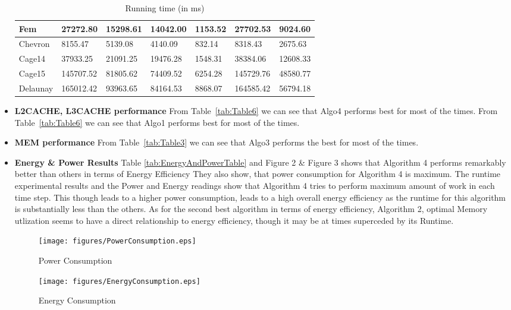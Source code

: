 \begin{itemize}
\begin{table}[th]
\begin{center}
\begin{tabular}{| l | l | l | l | l | l | l |}
	Fem & 27272.80 & 15298.61 & 14042.00 & \cellcolor{blue!25} 1153.52 & 27702.53 & 9024.60\\ \hline
	Chevron & 8155.47 & 5139.08 & 4140.09 & \cellcolor{blue!25} 832.14 & 8318.43 & 2675.63\\ \hline
	Cage14 & 37933.25 & 21091.25 & 19476.28 & \cellcolor{blue!25} 1548.31 & 38384.06 & 12608.33\\ \hline
	Cage15 & 145707.52 & 81805.62 & 74409.52 & \cellcolor{blue!25} 6254.28 & 145729.76 & 48580.77\\ \hline
	Delaunay & 165012.42 & 93963.65 & 84164.53 & \cellcolor{blue!25} 8868.07 & 164585.42 & 56794.18\\ \hline
    \end{tabular}
\end{center}
\caption{\capfont Running time (in ms)}
\label{tab:RuntimeTable}
\end{table}
\item
\textbf{L2CACHE, L3CACHE performance}
From Table~\ref{tab:Table6} we can see that Algo4 performs best for
most of the times.  From Table~\ref{tab:Table6} we can see that Algo1 performs best for
most of the times.
\item
\textbf{MEM performance}
From Table~\ref{tab:Table3} we can see that Algo3 performs the best
for most of the times.
\item
\textbf{Energy \& Power Results}
Table \ref{tab:EnergyAndPowerTable} and Figure 2 \& Figure 3 shows 
that Algorithm 4 performs remarkably better than others in terms of Energy Efficiency 
They also show, that power consumption for Algorithm 4 is maximum. The runtime
experimental results and the Power and Energy readings show that Algorithm 4 tries to perform
maximum amount of work in each time step. This though leads to a higher power consumption,
leads to a high overall energy efficiency as the runtime for this algorithm is 
substantially less than the others.
As for the second best algorithm in terms of energy efficiency, Algorithm 2,
optimal Memory utlization seems to have a direct relationship to energy efficiency,
though it may be at times superceded by its Runtime.
\begin{figure}[t]
    \centering
    \texttt{[image: figures/PowerConsumption.eps]}
    \caption{Power Consumption}
    \label{fig:Power Consumption}
\end{figure}
\begin{figure}[t]
    \centering
    \texttt{[image: figures/EnergyConsumption.eps]}
    \caption{Energy Consumption}
    \label{fig:Energy Consumption}

\end{figure}
\end{itemize}
